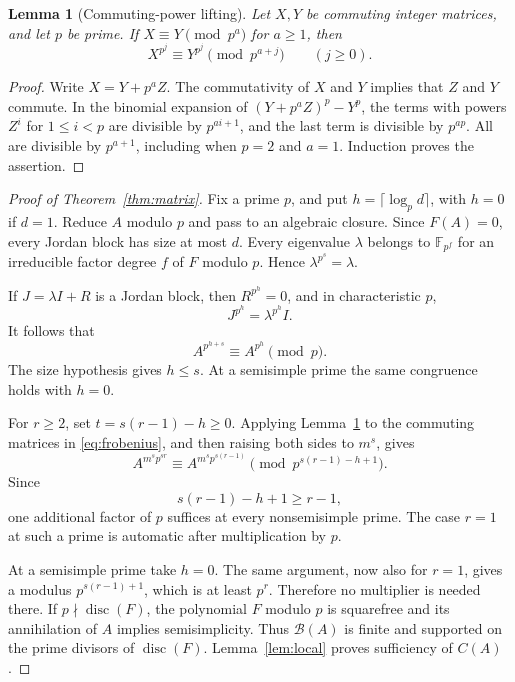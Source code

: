 \documentclass[11pt]{article}
\newtheorem{lemma}[theorem]{Lemma}
\theoremstyle{remark}
\newcommand{\disc}{\operatorname{disc}}
\begin{document}
\begin{lemma}[Commuting-power lifting]\label{lem:lifting}
Let $X,Y$ be commuting integer matrices, and let $p$ be prime. If $X\equiv Y\pmod{p^a}$ for $a\geq1$, then
\[
 X^{p^j}\equiv Y^{p^j}\pmod{p^{a+j}}\qquad(j\geq0).
\]
\end{lemma}
\begin{proof}
Write $X=Y+p^aZ$. The commutativity of $X$ and $Y$ implies that $Z$ and $Y$ commute. In the binomial expansion of $(Y+p^aZ)^p-Y^p$, the terms with powers $Z^i$ for $1\leq i<p$ are divisible by $p^{ai+1}$, and the last term is divisible by $p^{ap}$. All are divisible by $p^{a+1}$, including when $p=2$ and $a=1$. Induction proves the assertion.
\end{proof}

\begin{proof}[Proof of Theorem~\ref{thm:matrix}]
Fix a prime $p$, and put $h=\lceil\log_p d\rceil$, with $h=0$ if $d=1$. Reduce $A$ modulo $p$ and pass to an algebraic closure. Since $F(A)=0$, every Jordan block has size at most $d$. Every eigenvalue $\lambda$ belongs to $\mathbb F_{p^f}$ for an irreducible factor degree $f$ of $F$ modulo $p$. Hence $\lambda^{p^s}=\lambda$.

If $J=\lambda I+R$ is a Jordan block, then $R^{p^h}=0$, and in characteristic $p$,
\[
 J^{p^h}=\lambda^{p^h}I.
\]
It follows that
\begin{equation}\label{eq:frobenius}
 A^{p^{h+s}}\equiv A^{p^h}\pmod p.
\end{equation}
The size hypothesis gives $h\leq s$. At a semisimple prime the same congruence holds with $h=0$.

For $r\geq2$, set $t=s(r-1)-h\geq0$. Applying Lemma~\ref{lem:lifting} to the commuting matrices in \eqref{eq:frobenius}, and then raising both sides to $m^s$, gives
\begin{equation}\label{eq:localbound}
 A^{m^s p^{sr}}\equiv A^{m^s p^{s(r-1)}}
       \pmod{p^{s(r-1)-h+1}}.
\end{equation}
Since
\[
 s(r-1)-h+1\geq r-1,
\]
one additional factor of $p$ suffices at every nonsemisimple prime. The case $r=1$ at such a prime is automatic after multiplication by $p$.

At a semisimple prime take $h=0$. The same argument, now also for $r=1$, gives a modulus $p^{s(r-1)+1}$, which is at least $p^r$. Therefore no multiplier is needed there. If $p\nmid\disc(F)$, the polynomial $F$ modulo $p$ is squarefree and its annihilation of $A$ implies semisimplicity. Thus $\mathcal B(A)$ is finite and supported on the prime divisors of $\disc(F)$. Lemma~\ref{lem:local} proves sufficiency of $C(A)$.


\end{proof}
\end{document}
